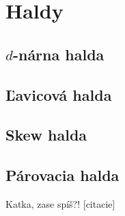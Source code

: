 \section{Haldy}
\subsection{$d$-nárna halda}
\subsection{Ľavicová halda}
\subsection{Skew halda}
\subsection{Párovacia halda}
Katka, zase spíš?!
[citacie]